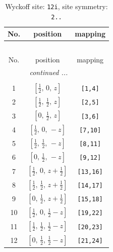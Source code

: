 \documentclass[fleqn,8pt]{jsarticle}
\begin{document}
\begin{longtable}{ccc}
\caption{Wyckoff site: {\tt 12i}, site symmetry: {\tt 2..}}
 \\
 \hline \hline
No. & position & mapping \\ \hline \endfirsthead

\multicolumn{2}{l}{\tablename\ \thetable{}} \\
 \hline \hline
No. & position & mapping \\ \hline \endhead

 \hline \hline
\multicolumn{2}{r}{\footnotesize\it continued ...} \\ \endfoot

 \hline \hline
\multicolumn{2}{r}{} \\ \endlastfoot

1 & $\left[ \frac{1}{2},\, 0,\, z \right]$ & {\tt [1,4]} \\ \hline
2 & $\left[ \frac{1}{2},\, \frac{1}{2},\, z \right]$ & {\tt [2,5]} \\ \hline
3 & $\left[ 0,\, \frac{1}{2},\, z \right]$ & {\tt [3,6]} \\ \hline
4 & $\left[ \frac{1}{2},\, 0,\, - z \right]$ & {\tt [7,10]} \\ \hline
5 & $\left[ \frac{1}{2},\, \frac{1}{2},\, - z \right]$ & {\tt [8,11]} \\ \hline
6 & $\left[ 0,\, \frac{1}{2},\, - z \right]$ & {\tt [9,12]} \\ \hline
7 & $\left[ \frac{1}{2},\, 0,\, z + \frac{1}{2} \right]$ & {\tt [13,16]} \\ \hline
8 & $\left[ \frac{1}{2},\, \frac{1}{2},\, z + \frac{1}{2} \right]$ & {\tt [14,17]} \\ \hline
9 & $\left[ 0,\, \frac{1}{2},\, z + \frac{1}{2} \right]$ & {\tt [15,18]} \\ \hline
10 & $\left[ \frac{1}{2},\, 0,\, \frac{1}{2} - z \right]$ & {\tt [19,22]} \\ \hline
11 & $\left[ \frac{1}{2},\, \frac{1}{2},\, \frac{1}{2} - z \right]$ & {\tt [20,23]} \\ \hline
12 & $\left[ 0,\, \frac{1}{2},\, \frac{1}{2} - z \right]$ & {\tt [21,24]} \\
\end{longtable}
\renewcommand{\arraystretch}{1.2}
\end{document}
